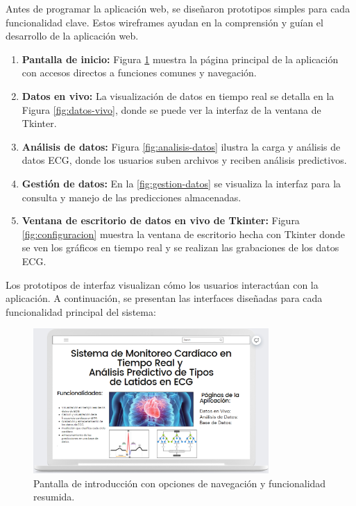 Antes de programar la aplicación web, se diseñaron prototipos simples para cada funcionalidad clave. Estos wireframes ayudan en la comprensión y guían el desarrollo de la aplicación web.

\begin{enumerate}
\item \textbf{Pantalla de inicio:} Figura \ref{fig:inicio} muestra la página principal de la aplicación con accesos directos a funciones comunes y navegación.

\item \textbf{Datos en vivo:} La visualización de datos en tiempo real se detalla en la Figura \ref{fig:datos-vivo}, donde se puede ver la interfaz de la ventana de Tkinter. 

\item \textbf{Análisis de datos:} Figura \ref{fig:analisis-datos} ilustra la carga y análisis de datos ECG, donde los usuarios suben archivos y reciben análisis predictivos.

\item \textbf{Gestión de datos:} En la \ref{fig:gestion-datos} se visualiza la interfaz para la consulta y manejo de las predicciones almacenadas.

\item \textbf{Ventana de escritorio de datos en vivo de Tkinter:} Figura \ref{fig:configuracion} muestra la ventana de escritorio hecha con Tkinter donde se ven los gráficos en tiempo real y se realizan las grabaciones de los datos ECG.

\end{enumerate}

Los prototipos de interfaz visualizan cómo los usuarios interactúan con la aplicación. A continuación, se presentan las interfaces diseñadas para cada funcionalidad principal del sistema:

\begin{figure}[h]
\centering
\includegraphics[width=0.8\textwidth]{img/prototipo_interfaz/1.png}
\caption{Pantalla de introducción con opciones de navegación y funcionalidad resumida.}
\label{fig:inicio}
\end{figure}

